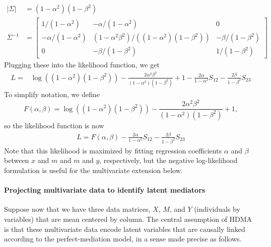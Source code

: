 \documentclass[
]{article}
\begin{document}
\begin{align}
\left|\Sigma\right| &= (1-\alpha^2)(1-\beta^2) \\
\Sigma^{-1} &= 
  \begin{bmatrix}
1/(1-\alpha^2) & -\alpha/(1-\alpha^2) & 0 \\
-\alpha/(1-\alpha^2) & (1-\alpha^2\beta^2)/\left((1-\alpha^2)(1-\beta^2)\right) & -\beta/(1-\beta^2) \\
0 & -\beta/(1-\beta^2) & 1/(1-\beta^2)
\end{bmatrix}
\end{align} Plugging these into the likelihood function, we get
\begin{align}
\label{eqn:mediation_loglikelihood}
L = &\log\left((1-\alpha^2)(1-\beta^2)\right) - \frac{2\alpha^2\beta^2}{(1-\alpha^2)(1-\beta^2)} + 1 - \frac{2\alpha}{1-\alpha^2} S_{12} - \frac{2\beta}{1-\beta^2} S_{23}
\end{align} To simplify notation, we define \begin{equation}
F(\alpha,\beta) = \log\left((1-\alpha^2)(1-\beta^2)\right) - \frac{2\alpha^2\beta^2}{(1-\alpha^2)(1-\beta^2)} + 1,
\end{equation} so the likelihood function is now \begin{align}
\label{eqn:mediation_loglikelihood_simple}
L = F(\alpha, \beta) - \frac{2\alpha}{1-\alpha^2} S_{12} - \frac{2\beta}{1-\beta^2} S_{23}
\end{align} Note that this likelihood is maximized by fitting regression
coefficients \(\alpha\) and \(\beta\) between \(x\) and \(m\) and \(m\)
and \(y\), respectively, but the negative log-likelihood formulation is
useful for the multivariate extension below.

\paragraph{Projecting multivariate data to identify latent
mediators}\label{projecting-multivariate-data-to-identify-latent-mediators}

Suppose now that we have three data matrices, \(X\), \(M\), and \(Y\)
(individuals by variables) that are mean centered by column. The central
assumption of HDMA is that these multivariate data encode latent
variables that are causally linked according to the perfect-mediation
model, in a sense made precise as follows.
\end{document}
